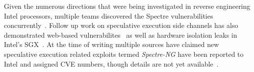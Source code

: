 Given the numerous directions that were being investigated in reverse
engineering Intel processors, multiple teams discovered the Spectre
vulnerabilities concurrently~\cite{spectre, project_zero, evtyushkin2018branchscope, maisuradze2018speculose}.
Follow 
up work on speculative execution side channels has also demonstrated
web-based vulnerabilites~\cite{genkin2018drive} as well as hardware isolation  
leaks in Intel's SGX~\cite{spectre_sgx}. At the time of writing multiple sources
have claimed new speculative execution related exploits termed \textit{Spectre-NG}
have been reported to Intel and assigned CVE numbers, though details are
not yet available~\cite{spectre_ng_gossip}.







%



